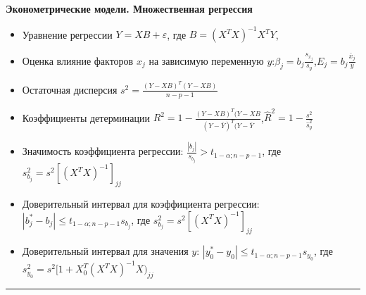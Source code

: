 \documentclass[a4paper,12pt]{extarticle}
\begin{document}
{
\bfseries   Эконометрические модели. Множественная регрессия
\par\vspace{1mm}
}

{\small
\begin{itemize}


\item Уравнение регрессии $Y=XB + \varepsilon$, где $B = (X^TX)^{-1}X^TY$, 
\item Оценка влияние факторов $x_j$ на зависимую переменную $y$:\quad $\beta_j = b_j \frac{s_{x_j}}{s_y}$,\quad $E_j=b_j \frac{\bar{x}_j}{\bar{y}}$
\item Остаточная дисперсия $s^2 = \frac{(Y-XB)^T(Y-XB)}{n-p-1}$
\item Коэффициенты детерминации $R^2 = 1-\frac{(Y-XB)^T(Y-XB}{(Y-\bar{Y})^T(Y-\bar{Y}}$,\qquad  $\hat{R}^2 = 1-\frac{s^2}{\hat{s}_y^2}$
\item Значимость коэффициента регрессии: $\frac{|b_j|}{s_{b_j}} > t_{1-\alpha;n-p-1}$, где $s^2_{b_j}=s^2[(X^TX)^{-1}]_{jj}$

\item Доверительный интервал для коэффициента регрессии: $|b^*_j-b_j| \leqslant t_{1-\alpha;n-p-1}s_{b_j}$, где $s^2_{b_j}=s^2[(X^TX)^{-1}]_{jj}$
\item Доверительный интервал для значения 
$y$: $|y^*_0-y_0| \leqslant t_{1-\alpha;n-p-1} s_{y_0}$, где $s^2_{y_0}=s^2[1+X_0^T(X^TX)^{-1}X)_{jj}$

\end{itemize}
}
\medskip
\hrule
\medskip 
\end{document}

